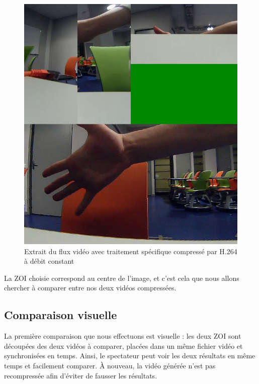 \documentclass[11pt,a4paper]{article}
\begin{document}
\begin{figure}[H]
\begin{center}
\includegraphics[scale=0.25]{images/comparaison_flux2.png}
\end{center}
\caption{Extrait du flux vidéo avec traitement spécifique compressé par H.264 à débit constant}
\label{}
\end{figure}


\bigbreak
La ZOI choisie correspond au centre de l'image, et c'est cela que nous allons chercher à comparer entre nos deux vidéos compressées.

\subsection{Comparaison visuelle}
La première comparaison que nous effectuons est visuelle : les deux ZOI sont découpées des deux vidéos à comparer, placées dans un même fichier vidéo et synchronisées en temps.
Ainsi, le spectateur peut voir les deux résultats en même temps et facilement comparer.
À nouveau, la vidéo générée n'est pas recompressée afin d'éviter de fausser les résultats.
\end{document}
